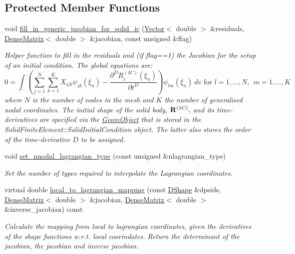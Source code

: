 \subsection*{Protected Member Functions}
\begin{DoxyCompactItemize}
\item 
void \hyperlink{classoomph_1_1SolidFiniteElement_a6baa515639dc04784c9bcd3b691f4f8c}{fill\+\_\+in\+\_\+generic\+\_\+jacobian\+\_\+for\+\_\+solid\+\_\+ic} (\hyperlink{classoomph_1_1Vector}{Vector}$<$ double $>$ \&residuals, \hyperlink{classoomph_1_1DenseMatrix}{Dense\+Matrix}$<$ double $>$ \&jacobian, const unsigned \&flag)
\begin{DoxyCompactList}\small\item\em Helper function to fill in the residuals and (if flag==1) the Jacobian for the setup of an initial condition. The global equations are\+: \[ 0 = \int \left( \sum_{j=1}^N \sum_{k=1}^K X_{ijk} \psi_{jk}(\xi_n) - \frac{\partial^D R^{(IC)}_i(\xi_n)}{\partial t^D} \right) \psi_{lm}(\xi_n) \ dv \mbox{ \ \ \ \ for \ \ \ $l=1,...,N, \ \ m=1,...,K$} \] where $ N $ is the number of nodes in the mesh and $ K $ the number of generalised nodal coordinates. The initial shape of the solid body, $ {\bf R}^{(IC)},$ and its time-\/derivatives are specified via the {\ttfamily \hyperlink{classoomph_1_1GeomObject}{Geom\+Object}} that is stored in the {\ttfamily Solid\+Finite\+Element\+::\+Solid\+Initial\+Condition} object. The latter also stores the order of the time-\/derivative $ D $ to be assigned. \end{DoxyCompactList}\item 
void \hyperlink{classoomph_1_1SolidFiniteElement_a74b681075150c90417939b0b0c836dda}{set\+\_\+nnodal\+\_\+lagrangian\+\_\+type} (const unsigned \&nlagrangian\+\_\+type)
\begin{DoxyCompactList}\small\item\em Set the number of types required to interpolate the Lagrangian coordinates. \end{DoxyCompactList}\item 
virtual double \hyperlink{classoomph_1_1SolidFiniteElement_a8974f3df67362e2b1be171b71294b16c}{local\+\_\+to\+\_\+lagrangian\+\_\+mapping} (const \hyperlink{classoomph_1_1DShape}{D\+Shape} \&dpsids, \hyperlink{classoomph_1_1DenseMatrix}{Dense\+Matrix}$<$ double $>$ \&jacobian, \hyperlink{classoomph_1_1DenseMatrix}{Dense\+Matrix}$<$ double $>$ \&inverse\+\_\+jacobian) const
\begin{DoxyCompactList}\small\item\em Calculate the mapping from local to lagrangian coordinates, given the derivatives of the shape functions w.\+r.\+t. local coorindates. Return the determinant of the jacobian, the jacobian and inverse jacobian. \end{DoxyCompactList}\item 

\end{DoxyCompactItemize}
